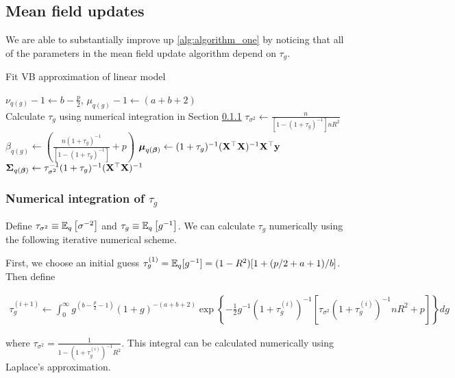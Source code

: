 \documentclass{amsart}[12pt]
\begin{document}
\subsection{Mean field updates}

We are able to substantially improve up \ref{alg:algorithm_one} by noticing that all of the
parameters in the mean field update algorithm depend on $\tau_g$.

\begin{algorithm}
\label{alg:algorithm_two}
\caption{Fit VB approximation of linear model}
\begin{algorithmic}
\REQUIRE $\nu_{q(g)} - 1 \leftarrow b - \frac{p}{2}$, $\mu_{q(g)} - 1 \leftarrow (a + b + 2)$ \\
\STATE Calculate $\tau_{g}$ using numerical integration in Section \ref{sec:num_int}
\ENDWHILE
\STATE $\tau_{\sigma^2} \leftarrow \frac{n}{[1 - (1 + \tau_g)^{-1}] n R^2}$
\STATE $\beta_{q(g)} \leftarrow \left(\frac{n (1 + \tau_g)^{-1}}{[1 - (1 + \tau_g)^{-1}]} + p \right)$
\STATE ${\boldsymbol \mu}_{q({\boldsymbol \beta})} \leftarrow (1 + \tau_g)^{-1} ({\bf X}^\top {\bf X})^{-1} {\bf X}^\top {\bf y}$
\STATE ${\boldsymbol \Sigma}_{q({\boldsymbol \beta})} \leftarrow \tau_{\sigma^2}^{-1} (1 + \tau_{g})^{-1}({\bf X}^\top {\bf X})^{-1}$
\end{algorithmic}
\end{algorithm}

\subsubsection{Numerical integration of $\tau_g$}\label{sec:num_int}

Define $\tau_{\sigma^2} \equiv \mathbb{E}_q \left[ \sigma^{-2} \right]$ and $\tau_g
\equiv \mathbb{E}_q \left[ g^{-1} \right]$. We can calculate $\tau_g$ numerically
using the following iterative numerical scheme.

First, we choose an initial guess $\tau_g^{(1)} = \mathbb{E}_q [g^{-1}] = (1 - R^2) [1 + (p / 2 + a + 1)/b]$. Then
define

\begin{align*}
\tau_g^{(i+1)} \leftarrow \int_0^\infty g^{\left(b - \frac{p}{2} - 1\right)}
 (1 + g)^{- (a + b + 2)}
\exp \left \{- \frac{1}{2} g^{-1}  (1 + \tau_g^{(i)})^{-1} [\tau_{\sigma^2} (1 + \tau_g^{(i)})^{-1} n R^2 + p]
	  \right \} dg
\end{align*}

where $\tau_{\sigma^2} = \frac{1}{1 - (1 + \tau_g^{(i)})^{-1} R^2}$. This integral can be calculated
numerically using Laplace's approximation.
\end{document}
